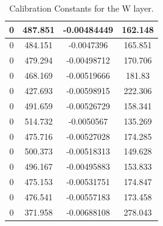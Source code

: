 \begin{table}[h]
{\begin{tabular}{|c|c|c|c|}
0   &   487.851   &   -0.00484449   &   162.148  \\  \hline  
0   &   484.151   &   -0.0047396   &   165.851  \\  \hline  
0   &   479.294   &   -0.00498712   &   170.706  \\  \hline  
0   &   468.169   &   -0.00519666   &   181.83  \\  \hline  
0   &   427.693   &   -0.00598915   &   222.306  \\  \hline  
0   &   491.659   &   -0.00526729   &   158.341  \\  \hline  
0   &   514.732   &   -0.0050567   &   135.269  \\  \hline  
0   &   475.716   &   -0.00527028   &   174.285  \\  \hline  
0   &   500.373   &   -0.00518313   &   149.628  \\  \hline  
0   &   496.167   &   -0.00495883   &   153.833  \\  \hline  
0   &   475.153   &   -0.00531751   &   174.847  \\  \hline  
0   &   476.541   &   -0.00557183   &   173.458  \\  \hline  
0   &   371.958   &   -0.00688108   &   278.043  \\  \hline   
        \end{tabular}
        }
        \caption{Calibration Constants for the W layer.}
        \label{tab:WattenC}
\end{table}


